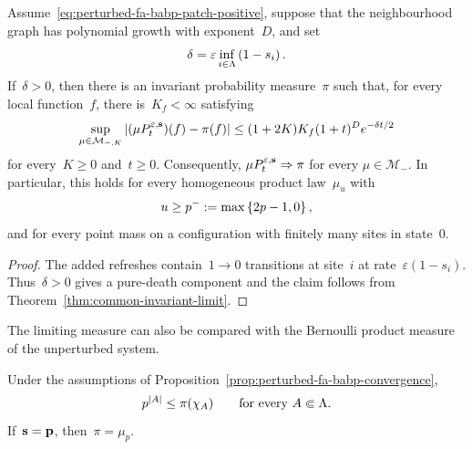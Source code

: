 \documentclass[EJP,preprint,NODS,nobera]{ejpecp}
\begin{document}
\begin{proposition}
\label{prop:perturbed-fa-babp-convergence}
Assume~\eqref{eq:perturbed-fa-babp-patch-positive}, suppose that the
neighbourhood graph has polynomial growth with exponent~$D$, and set
\begin{equation*}
\delta
=
\varepsilon\inf_{i\in\Lambda}\left(1-s_i\right).
\end{equation*}
If~$\delta>0$, then there is an invariant probability measure~$\pi$ such that,
for every local function~$f$, there is~$K_f<\infty$ satisfying
\begin{equation}
\label{eq:perturbed-fa-babp-convergence}
\sup_{\mu\in\mathcal M_{-,K}}
\left|(\mu P_t^{\varepsilon,\mathbf{s}})(f)-\pi(f)\right|
\leq
(1+2K)K_f(1+t)^D e^{-\delta t/2}
\end{equation}
for every~$K\geq0$ and~$t\geq0$. Consequently,
$\mu P_t^{\varepsilon,\mathbf{s}}\Rightarrow\pi$ for every
$\mu\in\mathcal M_-$. In particular, this holds for every homogeneous
product law~$\mu_u$ with
\begin{equation*}
u\geq p^-:=\max\left\{2p-1,0\right\},
\end{equation*}
and for every point mass on a configuration with finitely many sites in
state~$0$.
\end{proposition}

\begin{proof}
The added refreshes contain~$1\to0$ transitions at site~$i$ at
rate~$\varepsilon(1-s_i)$. Thus~$\delta>0$ gives a pure-death component and the claim follows from
Theorem~\ref{thm:common-invariant-limit}.
\end{proof}

The limiting measure can also be compared with the Bernoulli product measure
of the unperturbed system.

\begin{corollary}
\label{cor:perturbed-fa-babp-comparison}
Under the assumptions of
Proposition~\ref{prop:perturbed-fa-babp-convergence},
\begin{equation}
\label{eq:perturbed-fa-babp-stationary-comparison}
p^{\left|A\right|}
\leq
\pi(\chi_A)
\qquad
\text{for every }A\Subset\Lambda.
\end{equation}
If~$\mathbf{s}=\mathbf{p}$, then~$\pi=\mu_p$.
\end{corollary}
\end{document}
